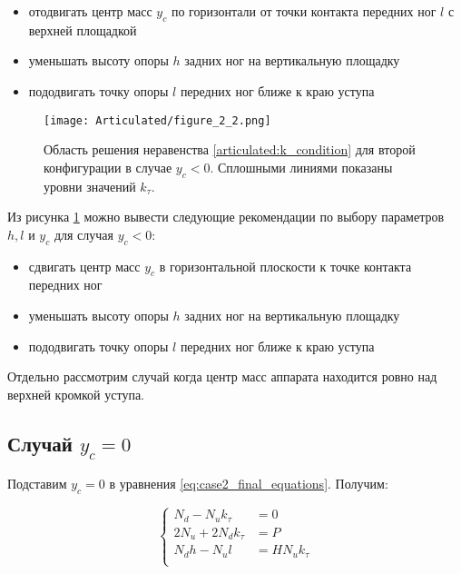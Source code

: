 \begin{itemize}
  \item отодвигать центр масс $y_c$ по горизонтали от точки контакта передних ног $l$ с верхней площадкой
  \item уменьшать высоту опоры $h$ задних ног на вертикальную площадку
  \item пододвигать точку опоры $l$ передних ног ближе к краю уступа
\end{itemize}

\begin{figure}[ht]
  \centering
  \texttt{[image: Articulated/figure\_2\_2.png]}
  \caption{Область решения неравенства \ref{articulated:k_condition} для второй конфигурации в случае $y_c < 0$. Сплошными линиями показаны уровни значений $k_\tau$.}
  \label{articulated:fig:case2_dimless_solution_2}
\end{figure}

Из рисунка \ref{articulated:fig:case2_dimless_solution_2} можно вывести следующие рекомендации по выбору параметров $h,l$ и $y_c$ для случая $y_c < 0$:

\begin{itemize}
  \item сдвигать центр масс $y_c$ в горизонтальной плоскости к точке контакта передних ног
  \item уменьшать высоту опоры $h$ задних ног на вертикальную площадку
  \item пододвигать точку опоры $l$ передних ног ближе к краю уступа
\end{itemize}

Отдельно рассмотрим случай когда центр масс аппарата находится ровно над верхней кромкой уступа.

\subsection{Случай $y_c = 0$}

Подставим $y_c = 0$ в уравнения \ref{eq:case2_final_equations}. Получим:

\begin{equation}
\label{articulated:case2_zero_yc}
\left\{
\begin{alignedat}{3}
N_d - N_uk_\tau &= 0 \\
2N_u+2N_dk_\tau &= P \\
N_dh - N_ul &= HN_uk_\tau\\
\end{alignedat}
\right.
\end{equation}

